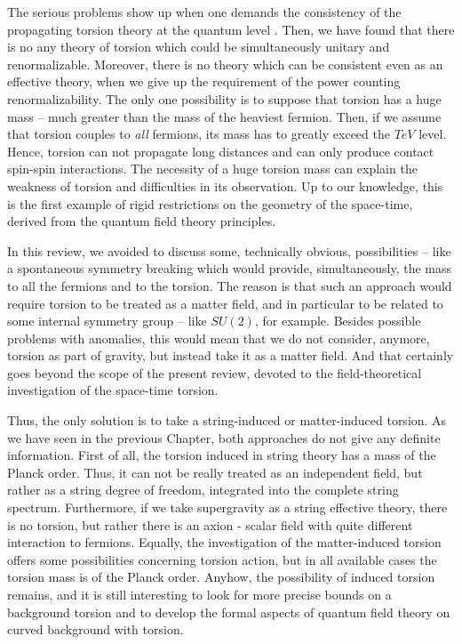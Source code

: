 The serious problems show up when one demands the consistency of 
the propagating torsion theory at the quantum level
\cite{betor,guhesh}. Then, we have 
found that there is no any theory of torsion which could be 
simultaneously unitary and renormalizable. Moreover, there is 
no theory which can be consistent even as 
an effective theory, when we give up the requirement of the 
power counting renormalizability. The only one possibility is to 
suppose that torsion has a huge mass -- much greater than the
mass of the heaviest fermion. Then, if we assume that torsion
couples to {\large\it all} fermions, its mass has to greatly
exceed the $TeV$ level. Hence, torsion can not propagate
long distances and can only produce contact spin-spin 
interactions. The necessity of a huge torsion mass can 
explain the weakness of torsion and difficulties in its 
observation. Up to our knowledge, this is the first example
of rigid restrictions on the geometry of the space-time,
derived from the quantum field theory principles.

In this review, we avoided to discuss some, technically obvious, 
possibilities -- like a spontaneous symmetry breaking 
which would provide, 
simultaneously, the mass to all the fermions and to the torsion. 
The reason is that such an approach would require torsion
to be treated as a matter field, and in particular to be 
related to some internal symmetry group -- like $SU(2)$, for
example. Besides possible problems with anomalies, this 
would mean that we do not consider, anymore, torsion as part 
of gravity, but instead take it as a matter field. And that 
certainly goes beyond the scope of the present review, 
devoted to the field-theoretical investigation of the 
space-time torsion. 

Thus, the only solution is to take a string-induced or 
matter-induced torsion. As we have seen in the previous 
Chapter, both approaches do not give any definite 
information. First of all, the torsion induced in string 
theory has a mass of the Planck order. Thus, it can not
be really treated as an independent field, but rather as
a string degree of freedom, integrated into the complete
string spectrum. Furthermore, if we take supergravity as
a string effective theory, there is no torsion, but 
rather there is an axion - scalar field with quite
different interaction to fermions. Equally, the investigation 
of the matter-induced torsion offers some possibilities 
concerning torsion action, but in all available cases 
the torsion mass is of the Planck order.  
Anyhow, the possibility of induced torsion remains, and 
it is still interesting to look for more precise 
bounds on a background torsion and to develop the 
formal aspects of quantum field theory on curved 
background with torsion.
 
